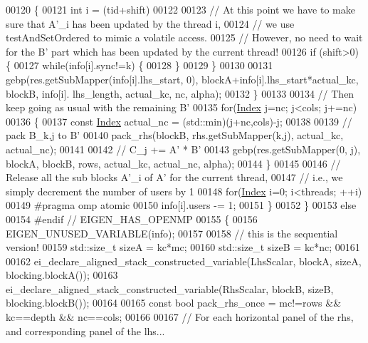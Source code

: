\begin{DoxyCode}
00120       \{
00121         \textcolor{keywordtype}{int} i = (tid+shift)%
00122 
00123         \textcolor{comment}{// At this point we have to make sure that A'\_i has been updated by the thread i,}
00124         \textcolor{comment}{// we use testAndSetOrdered to mimic a volatile access.}
00125         \textcolor{comment}{// However, no need to wait for the B' part which has been updated by the current thread!}
00126         \textcolor{keywordflow}{if} (shift>0) \{
00127           \textcolor{keywordflow}{while}(info[i].sync!=k) \{
00128           \}
00129         \}
00130 
00131         gebp(res.getSubMapper(info[i].lhs\_start, 0), blockA+info[i].lhs\_start*actual\_kc, blockB, info[i].
      lhs\_length, actual\_kc, nc, alpha);
00132       \}
00133 
00134       \textcolor{comment}{// Then keep going as usual with the remaining B'}
00135       \textcolor{keywordflow}{for}(\hyperlink{namespace_eigen_a62e77e0933482dafde8fe197d9a2cfde}{Index} j=nc; j<cols; j+=nc)
00136       \{
00137         \textcolor{keyword}{const} \hyperlink{namespace_eigen_a62e77e0933482dafde8fe197d9a2cfde}{Index} actual\_nc = (std::min)(j+nc,cols)-j;
00138 
00139         \textcolor{comment}{// pack B\_k,j to B'}
00140         pack\_rhs(blockB, rhs.getSubMapper(k,j), actual\_kc, actual\_nc);
00141 
00142         \textcolor{comment}{// C\_j += A' * B'}
00143         gebp(res.getSubMapper(0, j), blockA, blockB, rows, actual\_kc, actual\_nc, alpha);
00144       \}
00145 
00146       \textcolor{comment}{// Release all the sub blocks A'\_i of A' for the current thread,}
00147       \textcolor{comment}{// i.e., we simply decrement the number of users by 1}
00148       \textcolor{keywordflow}{for}(\hyperlink{namespace_eigen_a62e77e0933482dafde8fe197d9a2cfde}{Index} i=0; i<threads; ++i)
00149         #pragma omp atomic
00150         info[i].users -= 1;
00151     \}
00152   \}
00153   \textcolor{keywordflow}{else}
00154 \textcolor{preprocessor}{#endif // EIGEN\_HAS\_OPENMP}
00155   \{
00156     EIGEN\_UNUSED\_VARIABLE(info);
00157 
00158     \textcolor{comment}{// this is the sequential version!}
00159     std::size\_t sizeA = kc*mc;
00160     std::size\_t sizeB = kc*nc;
00161 
00162     ei\_declare\_aligned\_stack\_constructed\_variable(LhsScalar, blockA, sizeA, blocking.blockA());
00163     ei\_declare\_aligned\_stack\_constructed\_variable(RhsScalar, blockB, sizeB, blocking.blockB());
00164 
00165     \textcolor{keyword}{const} \textcolor{keywordtype}{bool} pack\_rhs\_once = mc!=rows && kc==depth && nc==cols;
00166 
00167     \textcolor{comment}{// For each horizontal panel of the rhs, and corresponding panel of the lhs...}

\end{DoxyCode}
